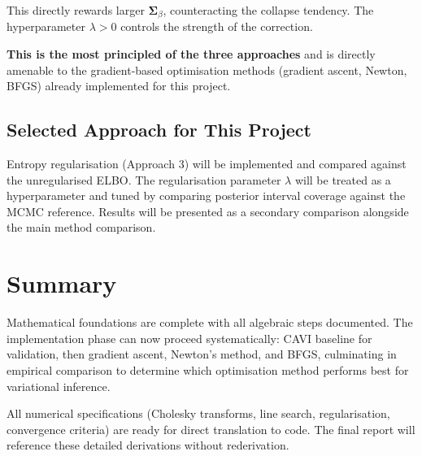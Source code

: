 \documentclass[11pt]{article}
\begin{document}
This directly rewards larger $\bm{\Sigma}_\beta$, counteracting the collapse tendency. The hyperparameter $\lambda > 0$ controls the strength of the correction.

\textbf{This is the most principled of the three approaches} and is directly amenable to the gradient-based optimisation methods (gradient ascent, Newton, BFGS) already implemented for this project.

\subsection*{Selected Approach for This Project}

Entropy regularisation (Approach 3) will be implemented and compared against the unregularised ELBO. The regularisation parameter $\lambda$ will be treated as a hyperparameter and tuned by comparing posterior interval coverage against the MCMC reference. Results will be presented as a secondary comparison alongside the main method comparison.

\section*{Summary}

Mathematical foundations are complete with all algebraic steps documented. The implementation phase can now proceed systematically: CAVI baseline for validation, then gradient ascent, Newton's method, and BFGS, culminating in empirical comparison to determine which optimisation method performs best for variational inference.

All numerical specifications (Cholesky transforms, line search, regularisation, convergence criteria) are ready for direct translation to code. The final report will reference these detailed derivations without rederivation.
\end{document}
